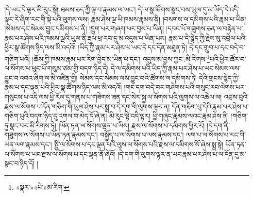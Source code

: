 །དེ་ཡང་དེ་ལྟར་མི་རུང་སྟེ། ཐམས་ཅད་ཀྱི་ལྟ་བ་རྣམས་ལ་ཡང་། དེ་ལ་སྣ་ཚོགས་སྣང་བས་ཡུལ་དུ་མ་ཡོད་དེ་འདི་ལྟར་རེ་ཞིག་རང་གི་སྡེ་པའི་ལུགས་ལས། རྣམ་ཤེས་ལྔ་ཡི་ཁམས་རྣམས་ནི། །བསགས་ལ་དམིགས་པའི་རྣམ་པ་ཡིན། །སེམས་དང་སེམས་བྱུང་དམིགས་པ་ནི། །དྲུག་པར་གཞག་པར་བྱས་པ་ཡིན། །དབང་པོ་གཟུགས་ཅན་ལ་བརྟེན་པ་རྣམ་པར་ཤེས་པའི་ཁམས་ལྔའི་ཡུལ་ནི་རྡུལ་ཕྲ་རབ་དུ་མ་འདུས་པ་ཡིན་པས། རྣམ་པ་དེ་སྙེད་ཀྱི་རྗེས་སུ་འབྲེལ་པའི་ཕྱིར་སྣ་ཚོགས་ཉིད་ལས་མི་འདའོ། །ཡིད་ཀྱི་རྣམ་པར་ཤེས་པ་ཡང་དེ་དང་དོན་མཐུན་ཏེ། དེ་དང་གྲུབ་པ་དང་བདེ་བ་གཅིག་པའོ། །ཆོས་ཀྱི་ཁམས་རྣམ་པར་རིག་བྱེད་མ་ཡིན་པ་དང་། འདུས་མ་བྱས་ཀྱང་:མི་རིགས་\footnote{«སྣར་»«པེ་»མ་རིག་}པའི་ཕྱིར་ཚོར་བ་ལ་སོགས་པ་ཕུང་པོ་གསུམ་ཙམ་གྱི་བདག་ཉིད་དེ། དེ་ལ་དམིགས་པའི་ཡིད་ཀྱི་རྣམ་པར་ཤེས་པ་ཡང་སེམས་ལས་བྱུང་བ་འབའ་ཞིག་ལ་མི་འཛིན་གྱི། སེམས་དང་སེམས་ལས་བྱུང་བའི་ཚོགས་ལ་དམིགས་ཏེ། དེའི་གྲངས་སྙེད་ཀྱི་རྣམ་པ་དང་ལྡན་པའི་ཕྱིར་སྣ་ཚོགས་ཉིད་ལས་མི་འདའོ། །གང་དག་བདེ་བར་གཤེགས་པའི་གསུང་རབ་ལེགས་པར་གསུངས་པ་འདི་ལས་ཕྱི་རོལ་དུ་གནས་པ་གཟེགས་ཟན་དང་སེར་སྐྱ་ལ་སོགས་པའི་ལུགས་ལ་འཆེལ་ལ། འབྲས་བུའི་རྫས་ལ་སོགས་པ་དོན་གཅིག་གི་ཡུལ་ཤེས་པར་སྨྲ་བ་དེ་དག་གི་ལུགས་ལྟར་ན། དོན་གཅིག་པུ་དེའི་རྣམ་པར་ཤེས་པ་གཅིག་པུའི་བདག་ཉིད་དུ་འགལ་བ་མེད་དོ་ཞེ་ན། མི་རུང་སྟེ་འདི་ལྟར། ཕྱི་གཞུང་རྣམས་ལའང་རྣམ་ཤེས་ནི། །གཅིག་ཏུ་སྣང་བར་མི་རིགས་ཏེ། །ཡོན་ཏན་ལ་སོགས་ལྡན་པ་ཡིས། རྫས་ལ་སོགས་པ་དམིགས་ཕྱིར་རོ། །དེ་དག་ནི་གཟུགས་ལ་སོགས་པ་ཡོན་ཏན་རྣམས་དང་། བསྐྱོད་པ་ལ་སོགས་པ་ལས་རྣམས་དང་། ལག་པ་ལ་སོགས་པ་རང་གི་ཡན་ལག་རྣམས་དང་། སྤྱི་ལ་སོགས་པ་དང་ལྡན་པའི་ལུས་ལ་སོགས་པའི་རྫས་ལ་དམིགས་སོ་ཞེས་སྨྲ་སྟེ། ཡོན་ཏན་ལ་སོགས་པ་ཡང་རྫས་ལ་སོགས་པ་དང་ལྡན་ནོ་ཞེའོ། །དེ་དག་གི་ལུགས་ལྟར་ན་ཡང་རྣམ་པར་ཤེས་པ་ལ་དོན་དུ་མ་སྣང་བ་ཉིད་དོ། །
